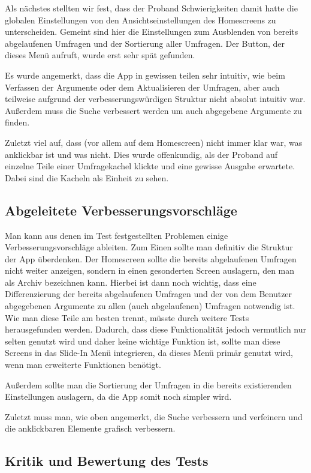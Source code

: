 Als nächstes stellten wir fest, dass der Proband Schwierigkeiten damit hatte die globalen Einstellungen von den Ansichtseinstellungen des Homescreens zu unterscheiden. Gemeint sind hier die Einstellungen zum Ausblenden von bereits abgelaufenen Umfragen und der Sortierung aller Umfragen. Der Button, der dieses Menü aufruft, wurde erst sehr spät gefunden.

Es wurde angemerkt, dass die App in gewissen teilen sehr intuitiv, wie beim Verfassen der Argumente oder dem Aktualisieren der Umfragen, aber auch teilweise aufgrund der verbesserungswürdigen Struktur nicht absolut intuitiv war.
Außerdem muss die Suche verbessert werden um auch abgegebene Argumente zu finden.

Zuletzt viel auf, dass (vor allem auf dem Homescreen) nicht immer klar war, was anklickbar ist und was nicht. Dies wurde offenkundig, als der Proband auf einzelne Teile einer Umfragekachel klickte und eine gewisse Ausgabe erwartete. Dabei sind die Kacheln als Einheit zu sehen.

\subsection{Abgeleitete Verbesserungsvorschläge}
\label{sec:verbesserungsvorschlaege}

Man kann aus denen im Test festgestellten Problemen einige Verbesserungsvorschläge ableiten. Zum Einen sollte man definitiv die Struktur der App überdenken. Der Homescreen sollte die bereits abgelaufenen Umfragen nicht weiter anzeigen, sondern in einen gesonderten Screen auslagern, den man als Archiv bezeichnen kann. Hierbei ist dann noch wichtig, dass eine Differenzierung der bereits abgelaufenen Umfragen und der von dem Benutzer abgegebenen Argumente zu allen (auch abgelaufenen) Umfragen notwendig ist. Wie man diese Teile am besten trennt, müsste durch weitere Tests herausgefunden werden. Dadurch, dass diese Funktionalität jedoch vermutlich nur selten genutzt wird und daher keine wichtige Funktion ist, sollte man diese Screens in das Slide-In Menü integrieren, da dieses Menü primär genutzt wird, wenn man erweiterte Funktionen benötigt.

Außerdem sollte man die Sortierung der Umfragen in die bereits existierenden Einstellungen auslagern, da die App somit noch simpler wird.

Zuletzt muss man, wie oben angemerkt, die Suche verbessern und verfeinern und die anklickbaren Elemente grafisch verbessern.

\subsection{Kritik und Bewertung des Tests}
\label{sec:kritik}

